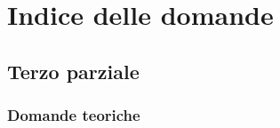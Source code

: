\documentclass[a4paper]{article}
\begin{document}
	
	
	
	
	
	\section{Indice delle domande}
	
	\subsection{Terzo parziale}
	
	\subsubsection{Domande teoriche}
	
\end{document}

